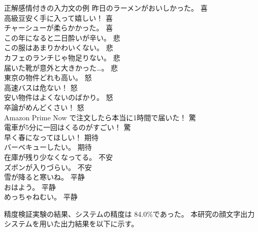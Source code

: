 \documentclass[11pt,a4j]{jsarticle}
\begin{document}
\begin{itembox}[l]{正解感情付きの入力文の例}
昨日のラーメンがおいしかった。 喜 \\
高級豆安く手に入って嬉しい！ 喜\\
チャーシューが柔らかかった。 喜\\
この年になると二日酔いが辛い。 悲\\
この服はあまりかわいくない。 悲\\
カフェのランチじゃ物足りない。 悲\\
届いた靴が意外と大きかった…。 悲\\
東京の物件どれも高い。 怒\\
高速バスは危ない！ 怒\\
安い物件はよくないのばかり。 怒\\
卒論がめんどくさい！ 怒\\
Amazon Prime Now で注文したら本当に1時間で届いた！ 驚\\
電車が5分に一回はくるのがすごい！ 驚\\
早く春になってほしい！ 期待\\
バーベキューしたい。 期待\\
在庫が残り少なくなってる。 不安\\
ズボンが入りづらい。 不安\\
雪が降ると寒いね。 平静\\
おはよう。 平静\\
めっちゃねむい。 平静\\
\end{itembox}

精度検証実験の結果、システムの精度は 84.0\%であった。
本研究の顔文字出力システムを用いた出力結果を以下に示す。
\end{document}

